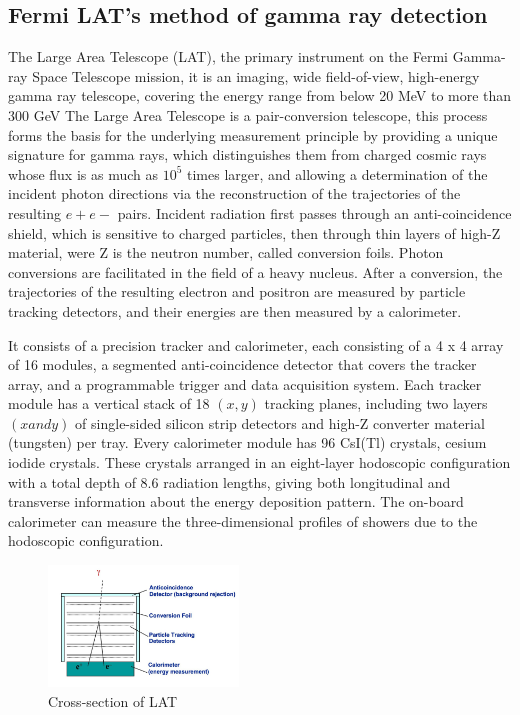 \subsection {Fermi LAT's method of gamma ray detection}
The Large Area Telescope (LAT), the primary instrument on the Fermi Gamma-ray Space Telescope mission, it is an imaging, wide field-of-view, high-energy gamma ray telescope, covering the energy range from below 20 MeV to more than 300 GeV \cite{16}
The Large Area Telescope is a pair-conversion telescope, this process forms the basis for the underlying measurement principle by providing a unique signature for gamma rays, which distinguishes them from charged cosmic rays whose flux is as much as $10^{5}$ times larger, and allowing a determination of the incident photon directions via the reconstruction of the trajectories of the resulting $e+ e-$ pairs.
Incident radiation first passes through an anti-coincidence shield, which is sensitive to charged particles, then through thin layers of high-Z material, were Z is the neutron number, called conversion foils. Photon conversions are facilitated in the field of a heavy nucleus. After a conversion, the trajectories of the resulting electron and positron are measured by particle tracking detectors, and their energies are then measured by a calorimeter.\cite{17} \cite{16}
\par It consists of a precision tracker and calorimeter, each consisting of a 4 x 4 array of 16 modules, a segmented anti-coincidence detector that covers the tracker array, and a programmable trigger and data acquisition system. Each tracker module has a vertical stack of 18 $(x,y)$ tracking planes, including two layers $(x and y)$ of single-sided silicon strip detectors and high-Z converter material (tungsten) per tray. Every calorimeter module has 96 CsI(Tl) crystals, cesium iodide crystals. These crystals arranged in an eight-layer hodoscopic configuration with a total depth of 8.6 radiation lengths, giving both longitudinal and transverse information about the energy deposition pattern. The on-board calorimeter can measure the three-dimensional profiles of showers due to the hodoscopic configuration.\cite{17}
\begin{figure}[hbt!] \label{lat}
\begin{center}
\includegraphics[width=0.451\textwidth]{figs/lat.png}
\caption{Cross-section of LAT}
\end{center}
\end{figure}


